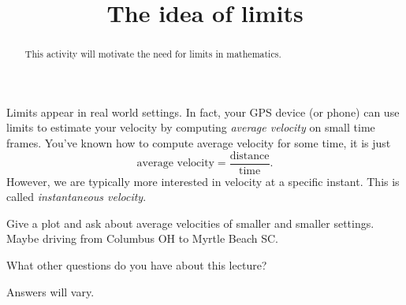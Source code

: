 \documentclass{ximera}
\title{The idea of limits}
\begin{document}
\begin{abstract}
  This activity will motivate the need for limits in mathematics.
\end{abstract}
\maketitle

Limits appear in real world settings. In fact, your GPS device (or
phone) can use limits to estimate your velocity by computing
\textit{average velocity} on small time frames. You've known how to
compute average velocity for some time, it is just
\[
\text{average velocity} = \frac{\text{distance}}{\text{time}}.
\]
However, we are typically more interested in velocity at a specific
instant. This is called \textit{instantaneous velocity}.

\begin{question}
  Give a plot and ask about average velocities of smaller and smaller
  settings. Maybe driving from Columbus OH to Myrtle Beach SC. 
  \begin{image}
  \end{image}

  \begin{solution}
    \begin{multiple-choice}
    \end{multiple-choice}  
  \end{solution}
\end{question}

What other questions do you have about this lecture?
\begin{free-response}
Answers will vary.
\end{free-response}
\end{document}
